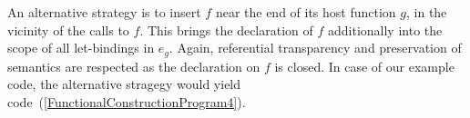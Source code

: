 An alternative strategy is to insert $f$ near the end of its host
function $g$, in the vicinity of the calls to $f$. This brings the
declaration of $f$ additionally into the scope of all let-bindings in
$e_g$. Again, referential transparency and preservation of semantics
are respected as the declaration on $f$ is closed. In case of our
example code, the alternative stragegy would yield
code~(\ref{FunctionalConstructionProgram4}).
